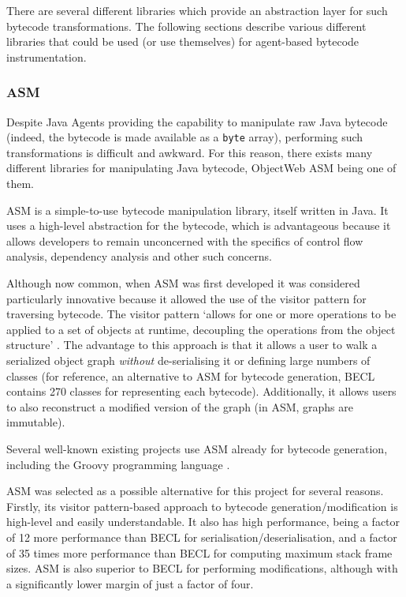 	There are several different libraries which provide an abstraction layer for such bytecode transformations. The following sections describe various different libraries that could be used (or use themselves) for agent-based bytecode instrumentation.

		\subsubsection{ASM} \label{sec:instrumentation/bytecode-instr/asm}
		Despite Java Agents providing the capability to manipulate raw Java bytecode (indeed, the bytecode is made available as a \texttt{byte} array), performing such transformations is difficult and awkward. For this reason, there exists many different libraries for manipulating Java bytecode, ObjectWeb ASM being one of them.

                ASM \citep{Bruneton2002} is a simple-to-use bytecode manipulation library, itself written in Java. It uses a high-level abstraction for the bytecode, which is advantageous because it allows developers to remain unconcerned with the specifics of control flow analysis, dependency analysis and other such concerns.

                Although now common, when ASM was first developed it was considered particularly innovative because it allowed the use of the visitor pattern \citep[p.~331]{Gamma1995} for traversing bytecode. The visitor pattern `allows for one or more operations to be applied to a set of objects at runtime, decoupling the operations from the object structure' \citep{McDonald2008}. The advantage to this approach is that it allows a user to walk a serialized object graph \emph{without} de-serialising it or defining large numbers of classes (for reference, an alternative to ASM for bytecode generation, BECL \citep{ApacheBECL} contains 270 classes for representing each bytecode). Additionally, it allows users to also reconstruct a modified version of the graph (in ASM, graphs are immutable).

                Several well-known existing projects use ASM already for bytecode generation, including the Groovy programming language \citep{GroovyDocs}.

                ASM was selected as a possible alternative for this project for several reasons. Firstly, its visitor pattern-based approach to bytecode generation/modification is high-level and easily understandable. It also has high performance, being a factor of 12 more performance than BECL for serialisation/deserialisation, and a factor of 35 times more performance than BECL for computing maximum stack frame sizes. ASM is also superior to BECL for performing modifications, although with a significantly lower margin of just a factor of four.

